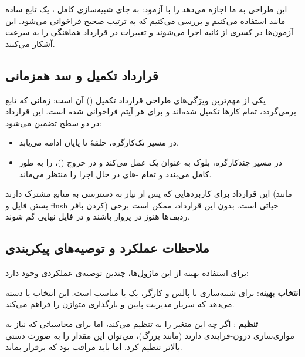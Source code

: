 این طراحی به ما اجازه می‌دهد  را با  آزمود: به جای شبیه‌سازی کامل ، یک تابع ساده مانند  استفاده می‌کنیم و بررسی می‌کنیم که  به ترتیب صحیح فراخوانی می‌شود. این آزمون‌ها در کسری از ثانیه اجرا می‌شوند و تغییرات در قرارداد هماهنگی را به سرعت آشکار می‌کنند.

\subsection{قرارداد تکمیل و سد همزمانی}

یکی از مهم‌ترین ویژگی‌های طراحی  قرارداد تکمیل () آن است: زمانی که تابع برمی‌گردد، تمام کارها تکمیل شده‌اند و  برای هر آیتم فراخوانی شده است. این قرارداد در دو سطح تضمین می‌شود:

\begin{itemize}
	\item در مسیر تک‌کارگره، حلقۀ  تا پایان  ادامه می‌یابد.
	\item در مسیر چندکارگره، بلوک  به عنوان یک  عمل می‌کند و در خروج ()،  را به طور کامل می‌بندد و تمام -های در حال اجرا را منتظر می‌ماند.
\end{itemize}

این قرارداد برای کاربردهایی که پس از  نیاز به دسترسی به منابع مشترک دارند (مانند بستن فایل  و flush کردن بافر) حیاتی است. بدون این قرارداد، ممکن است برخی ردیف‌ها هنوز در پرواز باشند و در فایل نهایی گم شوند.

\subsection{ملاحظات عملکرد و توصیه‌های پیکربندی}

برای استفاده بهینه از این ماژول‌ها، چندین توصیه‌ی عملکردی وجود دارد:

\textbf{انتخاب  بهینه}: برای شبیه‌سازی  با  پالس و  کارگر، یک  یا  مناسب است. این انتخاب  یا  دسته می‌دهد که سربار مدیریت پایین و بارگذاری متوازن را فراهم می‌کند.

\textbf{تنظیم }: اگر چه  این متغیر را به  تنظیم می‌کند، اما برای محاسباتی که نیاز به موازی‌سازی درون-فرایندی دارند (مانند  بزرگ)، می‌توان این مقدار را به صورت دستی بالاتر تنظیم کرد. اما باید مراقب بود که  برقرار بماند.

